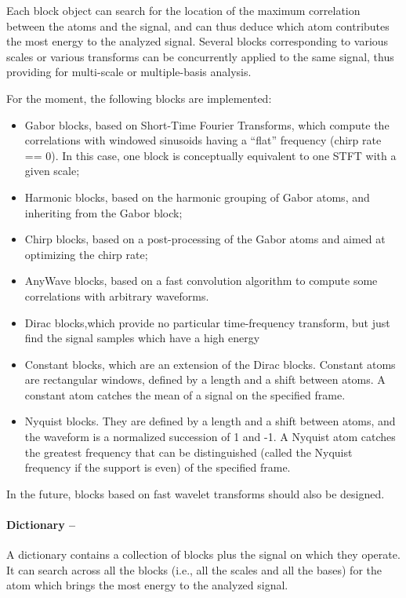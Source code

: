 \documentclass[11pt,a4paper]{article}
\begin{document}
Each block object can search for the location of the maximum correlation
between the atoms and the signal, and can thus deduce which atom contributes
the most energy to the analyzed signal. Several blocks corresponding to various
scales or various transforms can be concurrently applied to the same signal,
thus providing for multi-scale or multiple-basis analysis.

For the moment, the following blocks are implemented:
\begin{itemize}
\item Gabor blocks, based on Short-Time Fourier Transforms, which compute the
  correlations with windowed sinusoids having a ``flat'' frequency (chirp rate
  == 0). In this case, one block is conceptually equivalent to one STFT with a
  given scale;
\item Harmonic blocks, based on the harmonic grouping of Gabor atoms, and
  inheriting from the Gabor block;
\item Chirp blocks, based on a post-processing of the Gabor atoms and aimed at
  optimizing the chirp rate;
\item AnyWave blocks, based on a fast convolution algorithm to compute some
  correlations with arbitrary waveforms.
\item Dirac blocks,which provide no particular time-frequency
  transform, but just find the signal samples which have a high
  energy
\item Constant blocks, which are an extension of the Dirac blocks.
  Constant atoms are rectangular windows, defined by a length and a
  shift between atoms. A constant atom catches the mean of a signal on
  the specified frame.
\item Nyquist blocks. They are defined by a length and a shift between
  atoms, and the waveform is a normalized succession of 1 and -1. A
  Nyquist atom catches the greatest frequency that can be
  distinguished (called the Nyquist frequency if the support is even)
  of the specified frame.
\end{itemize}
In the future, blocks based on fast wavelet transforms should also be designed.

\paragraph{Dictionary --} A dictionary contains a collection of blocks plus
the signal on which they operate. It can search across all the blocks (i.e.,
all the scales and all the bases) for the atom which brings the most energy to
the analyzed signal.
\end{document}
